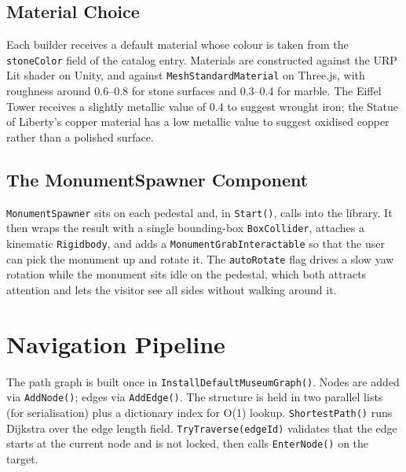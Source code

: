 \subsection{Material Choice}

Each builder receives a default material whose colour is taken from the \texttt{stoneColor} field of the catalog entry. Materials are constructed against the URP Lit shader on Unity, and against \texttt{MeshStandardMaterial} on Three.js, with roughness around 0.6--0.8 for stone surfaces and 0.3--0.4 for marble. The Eiffel Tower receives a slightly metallic value of 0.4 to suggest wrought iron; the Statue of Liberty's copper material has a low metallic value to suggest oxidised copper rather than a polished surface.

\subsection{The MonumentSpawner Component}

\texttt{MonumentSpawner} sits on each pedestal and, in \texttt{Start()}, calls into the library. It then wraps the result with a single bounding-box \texttt{BoxCollider}, attaches a kinematic \texttt{Rigidbody}, and adds a \texttt{MonumentGrabInteractable} so that the user can pick the monument up and rotate it. The \texttt{autoRotate} flag drives a slow yaw rotation while the monument sits idle on the pedestal, which both attracts attention and lets the visitor see all sides without walking around it.

\section{Navigation Pipeline}

The path graph is built once in \texttt{InstallDefaultMuseumGraph()}. Nodes are added via \texttt{AddNode()}; edges via \texttt{AddEdge()}. The structure is held in two parallel lists (for serialisation) plus a dictionary index for O(1) lookup. \texttt{ShortestPath()} runs Dijkstra over the edge length field. \texttt{TryTraverse(edgeId)} validates that the edge starts at the current node and is not locked, then calls \texttt{EnterNode()} on the target.


